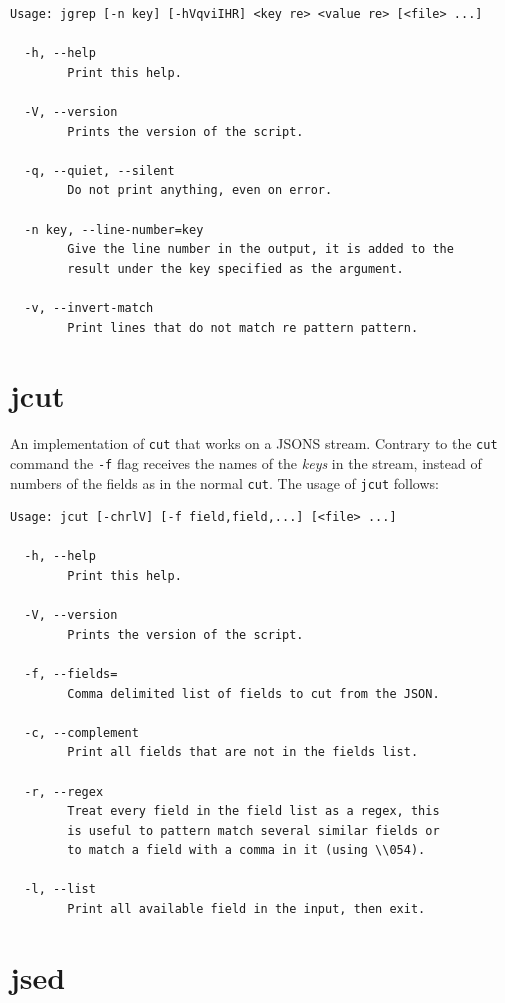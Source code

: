 \documentclass[11pt,a4paper,twoside,openright]{report}
\begin{document}
{\small
\begin{Verbatim}[samepage=true]
Usage: jgrep [-n key] [-hVqviIHR] <key re> <value re> [<file> ...]

  -h, --help
        Print this help.

  -V, --version
        Prints the version of the script.

  -q, --quiet, --silent
        Do not print anything, even on error.

  -n key, --line-number=key
        Give the line number in the output, it is added to the
        result under the key specified as the argument.

  -v, --invert-match
        Print lines that do not match re pattern pattern.
\end{Verbatim}
}

\section{jcut}

An implementation of \texttt{cut} that works on a JSONS stream.  Contrary to
the \texttt{cut} command the \texttt{-f} flag receives the names of the
\emph{keys} in the stream, instead of numbers of the fields as in the normal
\texttt{cut}.  The usage of \texttt{jcut} follows:

{\small
\begin{Verbatim}[samepage=true]
Usage: jcut [-chrlV] [-f field,field,...] [<file> ...]

  -h, --help
        Print this help.

  -V, --version
        Prints the version of the script.

  -f, --fields=
        Comma delimited list of fields to cut from the JSON.

  -c, --complement
        Print all fields that are not in the fields list.

  -r, --regex
        Treat every field in the field list as a regex, this
        is useful to pattern match several similar fields or
        to match a field with a comma in it (using \\054).

  -l, --list
        Print all available field in the input, then exit.
\end{Verbatim}
}

\section{jsed}
\end{document}
